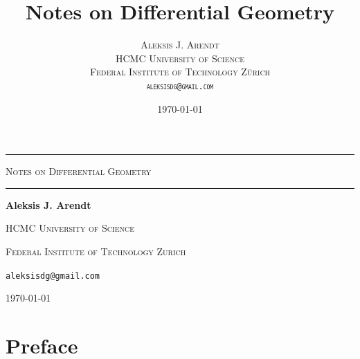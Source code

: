 \documentclass[12pt]{extbook}
\title{Notes on Differential Geometry}
\author{
  \scshape Aleksis J. Arendt\\[0.5em]
  \normalsize
  HCMC University of Science\\
  Federal Institute of Technology Zürich\\[0.5em]
  \texttt{aleksisdg@gmail.com}
}
\date{\today}
\begin{document}
\frontmatter



\begin{titlepage}
\thispagestyle{empty}
\begin{center}
\vspace*{2cm}

\rule{0.95\textwidth}{1.5pt}\par
\vspace{0.25cm}

{\LARGE\scshape Notes on Differential Geometry\par}

\vspace{0.25cm}
\rule{0.95\textwidth}{1.5pt}\par

\vspace{2.2cm}

{\large\bfseries Aleksis J. Arendt\par}
\vspace{0.3cm}
\scshape HCMC University of Science\par
\scshape Federal Institute of Technology Zurich\par
\vspace{0.3cm}
\texttt{aleksisdg@gmail.com}\par

\vspace{1.8cm}
\textsc{\today}\par

\end{center}
\end{titlepage}

\tableofcontents


\chapter*{Preface}

\mainmatter












\end{document}
